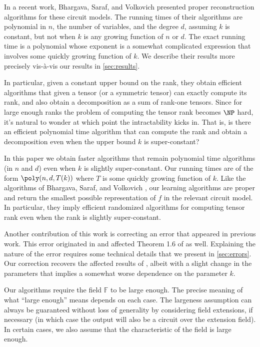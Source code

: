 \documentclass[12pt]{article}
\newcommand{\F}{\mathbb{F}}
\begin{document}
	
	In a recent work, Bhargava, Saraf, and Volkovich \cite{BSV21} presented proper reconstruction algorithms for these circuit models. The running times of their algorithms are polynomial in $n$, the number of variables, and the degree $d$, assuming $k$ is constant, but not when $k$ is any growing function of $n$ or $d$. The exact running time is a polynomial whose exponent is a somewhat complicated expression that involves some quickly growing function of $k$. We describe their results more precisely vis-\`{a}-vis our results in \autoref{sec:results}.
	
	In particular, given a constant upper bound on the rank, they obtain efficient algorithms that given a tensor (or a symmetric tensor) can exactly compute its rank, and also obtain a decomposition as a sum of rank-one tensors. Since for large enough ranks the problem of computing the tensor rank becomes $\NP$ hard, it's natural to wonder at which point the intractability kicks in. That is, is there an efficient polynomial time algorithm that can compute the rank and obtain a decomposition even when the upper bound $k$ is super-constant?
	
	In this paper we obtain faster algorithms that remain polynomial time algorithms (in $n$ and $d$) even when $k$ is slightly super-constant. Our running times are of the form $\poly(n,d,T(k))$ where $T$ is some quickly growing function of $k$. Like the algorithms of Bhargava, Saraf, and Volkovich \cite{BSV21}, our learning algorithms are proper and return the smallest possible representation of $f$ in the relevant circuit model. In particular, they imply efficient randomized  algorithms for computing tensor rank even when the rank is slightly super-constant.
	
	Another contribution of this work is correcting an error that appeared in previous work. This error originated in \cite{KarninShpilka09} and affected Theorem 1.6 of \cite{BSV21} as well. Explaining the nature of the error requires some technical details that we present in \autoref{sec:errors}. Our correction recovers the affected results of \cite{KarninShpilka09,BSV21}, albeit with a slight change in the parameters that implies a somewhat worse dependence on the parameter $k$. 
	
	
	Our algorithms require the field $\F$ to be large enough. The precise meaning of what ``large enough'' means depends on each case. The largeness assumption can always be guaranteed without loss of generality by considering field extensions, if necessary (in which case the output will also be a circuit over the extension field). In certain cases, we also assume that the characteristic of the field is large enough.
	
\end{document}
